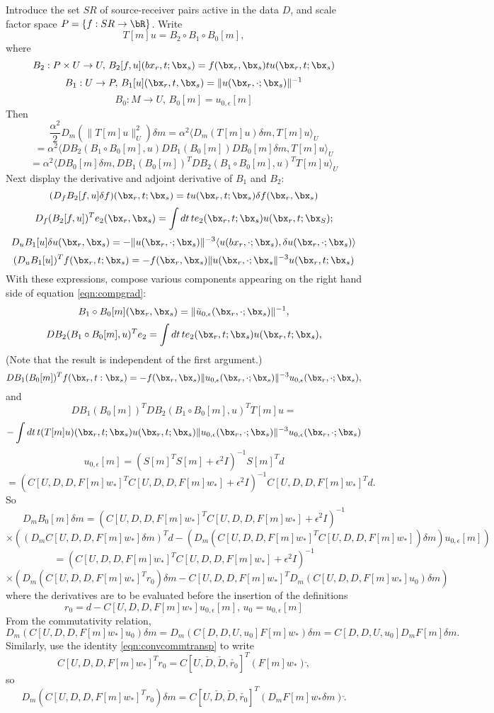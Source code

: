 Introduce the set $SR$ of source-receiver pairs active in the data
$D$, and scale factor space $P = \{f:SR \rightarrow \bR\}$. Write
\[
  T[m]u = B_2 \circ B_1 \circ B_0[m],
\]
where 
\[
B_2: P \times U \rightarrow U, \, B_2[f,u](bx_r,t;\bx_s) = f(\bx_r,\bx_s) tu(\bx_r,t;\bx_s)
\]
\[
B_1: U \rightarrow P, \,B_1[u](\bx_r,t,\bx_s) = \|u(\bx_r,\cdot; \bx_s)\|^{-1}
\]
\[
B_0: M \rightarrow U, \, B_0[m] = u_{0,\epsilon}[m]
\]
Then
\[
 \frac{\alpha^2}{2} D_m(\|T[m]u\|_U^2)\delta m = \alpha^2\langle D_m(
 T[m]u)\delta m, T[m]u \rangle_U
\]
\[
  =\alpha^2 \langle DB_2(B_1\circ B_0[m],u)DB_1(B_0[m]) DB_0[m]\delta m,
  T[m]u\rangle_U
\]
\begin{equation}
  \label{eqn:compgrad}
  =\alpha^2 \langle DB_0[m]\delta m, DB_1(B_0[m])^TDB_2(B_1\circ
  B_0[m],u)^TT[m]u\rangle_U
\end{equation}
Next display the derivative and adjoint derivative of $B_1$ and $B_2$:
$$
(D_fB_2[f,u]\delta f)(\bx_r,t;\bx_s) = tu(\bx_r,t;\bx_s)\delta f(\bx_r,\bx_s)
$$
$$
D_f(B_2[f,u])^Te_2(\bx_r,\bx_s) = \int dt\,te_2(\bx_r,t;\bx_s)u(\bx_r,t;\bx_S);
$$
$$
D_u B_1[u]\delta u(\bx_r,\bx_s) = -\|u(\bx_r,\cdot;\bx_s)\|^{-3}\langle u(bx_r,\cdot;\bx_s), \delta u(\bx_r,\cdot;\bx_s) \rangle
$$
$$
(D_u B_1[u])^Tf(\bx_r,t;\bx_s) =
-f(\bx_r,\bx_s)\|u(\bx_r,\cdot;\bx_s\|^{-3}u(\bx_r,t;\bx_s)
$$
With these expressions, compose various components appearing on the
right hand side of equation \ref{eqn:compgrad}:
\[
  B_1\circ B_0[m] (\bx_r,\bx_s) =  \|\tilde{u}_{0,\epsilon}(\bx_r,\cdot; \bx_s)\|^{-1},
\]
\[
 DB_2(B_1\circ B_0[m],u)^Te_2 = \int dt\,te_2(\bx_r,t;\bx_s)u(\bx_r,t;\bx_s),
\]
(Note that the result is independent of the first argument.)
\[
DB_1(B_0[m])^Tf(\bx_r,t:\bx_s)=
-f(\bx_r,\bx_s)\|u_{0,\epsilon}(\bx_r,\cdot;\bx_s)\|^{-3}u_{0,\epsilon}(\bx_r,\cdot;\bx_s),
\]
and
\[
  DB_1(B_0[m])^TDB_2(B_1\circ  B_0[m],u)^TT[m]u =
\]
\begin{equation}
  \label{eqn:compgrad1}
  -\int dt\,t(T[m]u)(\bx_r,t;\bx_s)u(\bx_r,t;\bx_s)
  \|u_{0,\epsilon}(\bx_r,\cdot;\bx_s)\|^{-3}u_{0,\epsilon}(\bx_r,\cdot;\bx_s)
\end{equation}
$$
u_{0,\epsilon}[m] = (S[m]^TS[m] + \epsilon^2 I)^{-1}S[m]^Td
$$
$$
= (C[U,D,D,F[m]w_*]^TC[U,D,D,F[m]w_*] + \epsilon^2 I)^{-1}C[U,D,D,F[m]w_*]^Td.
$$
So
$$
D_mB_0[m]\delta m = (C[U,D,D,F[m]w_*]^TC[U,D,D,F[m]w_*] + \epsilon^2 I)^{-1}
$$
$$
\times ((D_mC[U,D,D,F[m]w_*]\delta m)^Td -(D_m(C[U,D,D,F[m]w_*]^TC[U,D,D,F[m]w_*])\delta m)u_{0,\epsilon}[m])
$$
$$
=(C[U,D,D,F[m]w_*]^TC[U,D,D,F[m]w_*] + \epsilon^2 I)^{-1}
$$
$$
\times
(D_m(C[U,D,D,F[m]w_*]^Tr_0)\delta m  - C[U,D,D,F[m]w_*]^TD_m(C[U,D,D,F[m]w_*]u_0)\delta m)
$$ 
where the derivatives are to be evaluated before the insertion of the definitions 
$$
r_0 = d -C[U,D,D,F[m]w_*]u_{0,\epsilon}[m], \, u_0 = u_{0,\epsilon}[m]
$$
From the commutativity relation,
$$
D_m(C[U,D,D,F[m]w_*]u_0)\delta m = D_m(C[D,D,U,u_0]F[m]w_*)\delta m
=C[D,D,U,u_0]D_mF[m]\delta m.
$$
Similarly, use the identity \ref{eqn:convcommtransp} to write
$$
C[U,D,D,F[m]w_*]^Tr_0 = C[U,\check{D},\check{D},\check{r_0}]^T({F[m]w_*})\check, 
$$
so
$$
D_m(C[U,D,D,F[m]w_*]^Tr_0)\delta m=
C[U,\check{D},\check{D},\check{r_0}]^T(D_mF[m]w_* \delta m)\check.
$$


